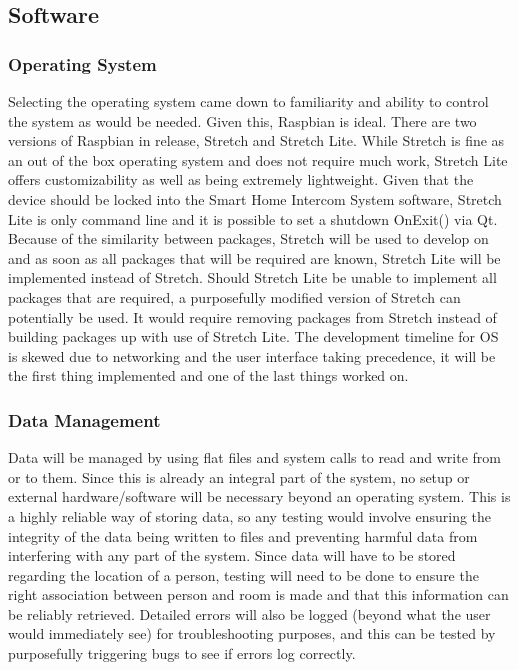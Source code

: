 \documentclass[onecolumn, draftclsnofoot,10pt, compsoc]{IEEEtran}
\begin{document}
\subsection{Software}
\subsubsection{Operating System}
Selecting the operating system came down to familiarity and ability to control the system as would be needed. Given this, Raspbian is ideal. There are two versions of Raspbian in release, Stretch and Stretch Lite. While Stretch is fine as an out of the box operating system and does not require much work, Stretch Lite offers customizability as well as being extremely lightweight. Given that the device should be locked into the Smart Home Intercom System software, Stretch Lite is only command line and it is possible to set a shutdown OnExit() via Qt. Because of the similarity between packages, Stretch will be used to develop on and as soon as all packages that will be required are known, Stretch Lite will be implemented instead of Stretch. Should Stretch Lite be unable to implement all packages that are required, a purposefully modified version of Stretch can potentially be used. It would require removing packages from Stretch instead of building packages up with use of Stretch Lite. The development timeline for OS is skewed due to networking and the user interface taking precedence, it will be the first thing implemented and one of the last things worked on.

\subsubsection{Data Management}
Data will be managed by using flat files and system calls to read and write from or to them. Since this is already an integral part of the system, no setup or external hardware/software will be necessary beyond an operating system. This is a highly reliable way of storing data, so any testing would involve ensuring the integrity of the data being written to files and preventing harmful data from interfering with any part of the system. Since data will have to be stored regarding the location of a person, testing will need to be done to ensure the right association between person and room is made and that this information can be reliably retrieved. Detailed errors will also be logged (beyond what the user would immediately see) for troubleshooting purposes, and this can be tested by purposefully triggering bugs to see if errors log correctly.
\end{document}
